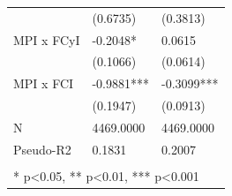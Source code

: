 \begin{table}[!ht]
\begin{center}
{\begin{tabular}{p{7cm}p{3cm}p{3cm}}
                                           & (0.6735)                    & (0.3813)                     \\
MPI x FCyI                                 & -0.2048*                    & 0.0615                       \\
                                           & (0.1066)                    & (0.0614)                     \\
MPI x FCI                                  & -0.9881***                  & -0.3099***                   \\
                                           & (0.1947)                    & (0.0913)                     \\
N                                          & 4469.0000                   & 4469.0000                    \\
Pseudo-R2                                  & 0.1831                      & 0.2007                       \\
\hline \\
\multicolumn{3}{l}{* p<0.05,  ** p<0.01,  *** p<0.001}
\end{tabular}
}
\end{center}
\end{table}